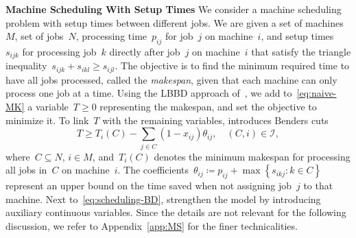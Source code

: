 \documentclass[a4paper,10pt]{article}
\newcommand{\define}{\coloneqq}
\newcommand{\brackets}[1]{\left\{ #1 \right\}}
\theoremstyle{definition}
\begin{document}
\medskip
\textbf{Machine Scheduling With Setup Times}
We consider a machine scheduling problem with setup times between different jobs.
We are given a set of machines~$M$, set of jobs~$N$, processing time~$p_{ij}$ for job~$j$ on machine~$i$, and setup times~$s_{ijk}$ for processing job~$k$ directly after job~$j$ on machine~$i$ that satisfy the triangle inequality~$s_{ijk} + s_{ikl} \geq s_{ijl}$.
The objective is to find the minimum required time to have all jobs processed, called the \emph{makespan}, given that each machine can only process one job at a time.
Using the LBBD approach of~\cite{tran2016decomposition}, we add to~\eqref{eq:naive-MK} a variable~$T \geq 0$ representing the makespan, and set the objective to minimize it.
To link~$T$ with the remaining variables, \cite{tran2016decomposition} introduces Benders cuts
\begin{equation}
  T \geq T_i(C) - \sum_{j\in C} (1-x_{ij})\theta_{ij}, \quad (C, i)\in \mathcal{I},
  \label{eq:scheduling-BD}
\end{equation}
where~$C \subseteq N$, $i \in M$, and~$T_i(C)$ denotes the minimum makespan for processing all jobs in~$C$ on machine~$i$.
The coefficients~$\theta_{ij}\define p_{ij} + \max\brackets{s_{ikj} : k\in C}$ represent an upper bound on the time saved when not assigning job~$j$ to that machine.
Next to~\eqref{eq:scheduling-BD}, \cite{tran2016decomposition} strengthen the model by introducing auxiliary continuous variables.
Since the details are not relevant for the following discussion, we refer to Appendix~\ref{app:MS} for the finer technicalities.
\end{document}
